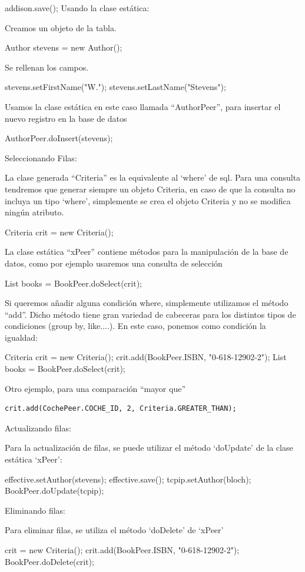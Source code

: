 \documentclass[12pt, oneside]{article}
\begin{document}
addison.save();
Usando la clase estática:

Creamos un objeto de la tabla.

Author stevens = new Author();

Se rellenan los campos.

stevens.setFirstName("W.");
stevens.setLastName("Stevens");

Usamos la clase estática en este caso llamada “AuthorPeer”, para insertar el nuevo registro en la base de datos

AuthorPeer.doInsert(stevens);


Seleccionando Filas:

La clase generada “Criteria” es la equivalente al ‘where’ de sql. Para una consulta tendremos que generar siempre un objeto Criteria, en caso de que la consulta no incluya un tipo ‘where’, simplemente se crea el objeto Criteria y no se modifica ningún atributo.

Criteria crit = new Criteria();

La clase estática “xPeer” contiene métodos para la manipulación de la base de datos, como por ejemplo usaremos una consulta de selección

List books = BookPeer.doSelect(crit);

Si queremos añadir alguna condición where, simplemente utilizamos el método “add”. Dicho método tiene gran variedad de cabeceras para los distintos tipos de condiciones (group by, like....). En este caso, ponemos como condición la igualdad:

Criteria crit = new Criteria();
crit.add(BookPeer.ISBN, "0-618-12902-2");
List books = BookPeer.doSelect(crit);

Otro ejemplo, para una comparación “mayor que”

\begin{lstlisting}
crit.add(CochePeer.COCHE_ID, 2, Criteria.GREATER_THAN);
\end{lstlisting}

Actualizando filas: 

Para la actualización de filas, se puede utilizar el método ‘doUpdate’ de la clase estática ‘xPeer’:

effective.setAuthor(stevens);
effective.save();
tcpip.setAuthor(bloch);
BookPeer.doUpdate(tcpip);

Eliminando filas:

Para eliminar filas, se utiliza el método ‘doDelete’ de ‘xPeer’

crit = new Criteria();
crit.add(BookPeer.ISBN, "0-618-12902-2");
BookPeer.doDelete(crit);
\end{document}
